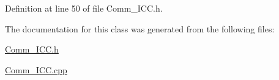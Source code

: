 Definition at line 50 of file Comm\+\_\+\+I\+C\+C.\+h.



The documentation for this class was generated from the following files\+:\begin{DoxyCompactItemize}
\item 
\mbox{\hyperlink{_comm___i_c_c_8h}{Comm\+\_\+\+I\+C\+C.\+h}}\item 
\mbox{\hyperlink{_comm___i_c_c_8cpp}{Comm\+\_\+\+I\+C\+C.\+cpp}}\end{DoxyCompactItemize}
